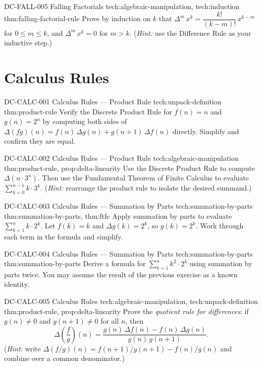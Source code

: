 \exstubgenfull
  {DC-FALL-005}
  {Falling Factorials}
  {tech:algebraic-manipulation, tech:induction}
  {thm:falling-factorial-rule}
  {Prove by induction on \(k\) that
  \(\Delta^m\, x^{\underline{k}} = \dfrac{k!}{(k-m)!}\, x^{\underline{k-m}}\)
  for \(0 \le m \le k\), and \(\Delta^m\, x^{\underline{k}} = 0\) for \(m > k\).
  (\emph{Hint:} use the Difference Rule as your inductive step.)}

\section*{Calculus Rules}

\exstubgenfull
  {DC-CALC-001}
  {Calculus Rules --- Product Rule}
  {tech:unpack-definition}
  {thm:product-rule}
  {Verify the Discrete Product Rule for \(f(n) = n\) and \(g(n) = 2^n\)
  by computing both sides of
  \(\Delta(fg)(n) = f(n)\,\Delta g(n) + g(n+1)\,\Delta f(n)\)
  directly. Simplify and confirm they are equal.}

\exstubgenfull
  {DC-CALC-002}
  {Calculus Rules --- Product Rule}
  {tech:algebraic-manipulation}
  {thm:product-rule, prop:delta-linearity}
  {Use the Discrete Product Rule to compute \(\Delta(n \cdot 3^n)\).
  Then use the Fundamental Theorem of Finite Calculus to evaluate
  \(\displaystyle\sum_{k=0}^{n-1} k \cdot 3^k\).
  (\emph{Hint:} rearrange the product rule to isolate the desired summand.)}

\exstubgenfull
  {DC-CALC-003}
  {Calculus Rules --- Summation by Parts}
  {tech:summation-by-parts}
  {thm:summation-by-parts, thm:ftfc}
  {Apply summation by parts to evaluate
  \(\displaystyle\sum_{k=1}^{n} k \cdot 2^k\).
  Let \(f(k) = k\) and \(\Delta g(k) = 2^k\), so \(g(k) = 2^k\).
  Work through each term in the formula and simplify.}

\exstubgenfull
  {DC-CALC-004}
  {Calculus Rules --- Summation by Parts}
  {tech:summation-by-parts}
  {thm:summation-by-parts}
  {Derive a formula for \(\displaystyle\sum_{k=1}^{n} k^2 \cdot 2^k\)
  using summation by parts twice. You may assume the result of the
  previous exercise as a known identity.}

\exstubgenfull
  {DC-CALC-005}
  {Calculus Rules}
  {tech:algebraic-manipulation, tech:unpack-definition}
  {thm:product-rule, prop:delta-linearity}
  {Prove the \emph{quotient rule for differences}: if \(g(n) \ne 0\) and
  \(g(n+1) \ne 0\) for all \(n\), then
  \[
  \Delta\!\left(\frac{f}{g}\right)(n)
  = \frac{g(n)\,\Delta f(n) - f(n)\,\Delta g(n)}{g(n)\,g(n+1)}.
  \]
  (\emph{Hint:} write \(\Delta(f/g)(n) = f(n+1)/g(n+1) - f(n)/g(n)\)
  and combine over a common denominator.)}

